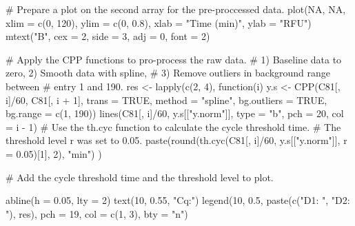 \begin{example}
# Prepare a plot on the second array for the pre-proccessed data.
plot(NA, NA, xlim = c(0, 120), ylim = c(0, 0.8), xlab = "Time (min)", ylab = 
"RFU")
mtext("B", cex = 2, side = 3, adj = 0, font = 2)

# Apply the CPP functions to pro-process the raw data.
# 1) Baseline data to zero, 2) Smooth data with spline,
# 3) Remove outliers in background range between 
# entry 1 and 190.
res <- lapply(c(2, 4), function(i) {
  y.s <- CPP(C81[, i]/60, C81[, i + 1],
             trans = TRUE, 
             method = "spline",
             bg.outliers = TRUE,
             bg.range = c(1, 190))
  lines(C81[, i]/60, y.s[["y.norm"]], type = "b", pch = 20, col = i - 1)
  # Use the th.cyc function to calculate the cycle threshold time. 
  # The threshold level r was set to 0.05.
  paste(round(th.cyc(C81[, i]/60, y.s[["y.norm"]], r = 0.05)[1], 2), "min")
})

# Add the cycle threshold time and the threshold level to plot.

abline(h = 0.05, lty = 2)
text(10, 0.55, "Cq:")
legend(10, 0.5, paste(c("D1: ", "D2: "), res), pch = 19, col = c(1, 3), bty = 
"n")
\end{example}



